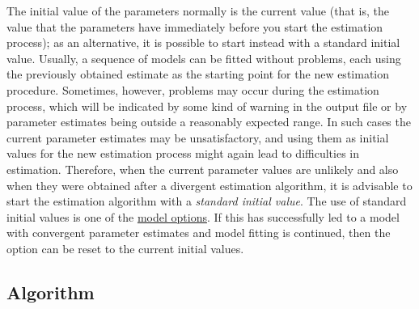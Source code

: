 \documentclass[a4paper,fleqn]{article}
\newcommand{\+}{\, + \,}
\begin{document}
{The initial value of the parameters normally is the current value (that is,
the value that the parameters have immediately before you start
the estimation process);
as an alternative, it is possible to start instead with
a standard initial value.
Usually, a sequence of models can be
fitted without problems, each using the previously obtained estimate
as the starting point for the new estimation procedure.
Sometimes, however,
problems may occur during the estimation process, which will
be indicated by some kind of warning in the output file
or by parameter estimates being outside a reasonably expected range.
In such cases the current parameter estimates may be
unsatisfactory, and using them as initial
values for the new estimation process might again lead to
difficulties in estimation. Therefore,
when the current parameter values are unlikely and also
when they were obtained after a divergent estimation algorithm,
it is advisable to start the estimation algorithm
with a \emph{standard initial value}.
The use of standard initial values is one of the
\hyperlink{T_S_options}{model options}.
If this has successfully led to a model with convergent
parameter estimates and model fitting is continued,
then the option can be reset to the
current initial values.

\begin{screen}
\newpage
\end{screen}
\subsection{\label{algorithm}Algorithm} %

}
\end{document}
